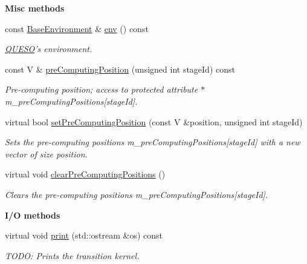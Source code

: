 \begin{Indent}{\bf Misc methods}\par
\begin{DoxyCompactItemize}
\item 
const \hyperlink{class_q_u_e_s_o_1_1_base_environment}{Base\-Environment} \& \hyperlink{class_q_u_e_s_o_1_1_base_t_k_group_ac71535d0b77dfdd1419ff2dbf5d6d037}{env} () const 
\begin{DoxyCompactList}\small\item\em \hyperlink{namespace_q_u_e_s_o}{Q\-U\-E\-S\-O}'s environment. \end{DoxyCompactList}\item 
const V \& \hyperlink{class_q_u_e_s_o_1_1_base_t_k_group_aa864c6cc07327a698f91cef72cdc35aa}{pre\-Computing\-Position} (unsigned int stage\-Id) const 
\begin{DoxyCompactList}\small\item\em Pre-\/computing position; access to protected attribute $\ast$m\-\_\-pre\-Computing\-Positions\mbox{[}stage\-Id\mbox{]}. \end{DoxyCompactList}\item 
virtual bool \hyperlink{class_q_u_e_s_o_1_1_base_t_k_group_acd1efb5b2ae3eb4f1130fa37201545d8}{set\-Pre\-Computing\-Position} (const V \&position, unsigned int stage\-Id)
\begin{DoxyCompactList}\small\item\em Sets the pre-\/computing positions {\ttfamily m\-\_\-pre\-Computing\-Positions}\mbox{[}stage\-Id\mbox{]} with a new vector of size {\ttfamily position}. \end{DoxyCompactList}\item 
virtual void \hyperlink{class_q_u_e_s_o_1_1_base_t_k_group_adb4decb4e8f01dce2ae4d5a3333c74f8}{clear\-Pre\-Computing\-Positions} ()
\begin{DoxyCompactList}\small\item\em Clears the pre-\/computing positions {\ttfamily m\-\_\-pre\-Computing\-Positions}\mbox{[}stage\-Id\mbox{]}. \end{DoxyCompactList}\end{DoxyCompactItemize}
\end{Indent}
\begin{Indent}{\bf I/\-O methods}\par
\begin{DoxyCompactItemize}
\item 
virtual void \hyperlink{class_q_u_e_s_o_1_1_base_t_k_group_ad6f7aa1ed1f75476b46333847e5086ba}{print} (std\-::ostream \&os) const 
\begin{DoxyCompactList}\small\item\em T\-O\-D\-O\-: Prints the transition kernel. \end{DoxyCompactList}\end{DoxyCompactItemize}
\end{Indent}
